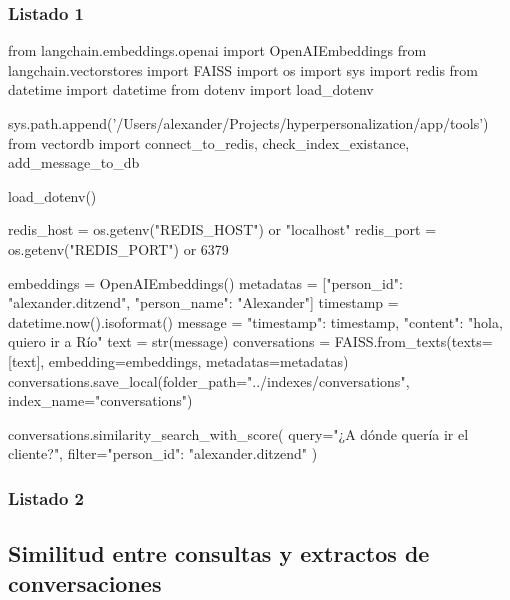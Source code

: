\subsubsection{Listado 1}
\label{anexo:code-4-1-2-1}

\begin{APACode}
from langchain.embeddings.openai import OpenAIEmbeddings
from langchain.vectorstores import FAISS
import os
import sys
import redis
from datetime import datetime
from dotenv import load_dotenv

sys.path.append('/Users/alexander/Projects/hyperpersonalization/app/tools')
from vectordb import connect_to_redis, check_index_existance, add_message_to_db

load_dotenv()

redis_host = os.getenv("REDIS_HOST") or "localhost"
redis_port = os.getenv("REDIS_PORT") or 6379

embeddings = OpenAIEmbeddings()
metadatas = [{"person_id": "alexander.ditzend", "person_name": "Alexander"}]
timestamp = datetime.now().isoformat()
message = {"timestamp": timestamp, "content": "hola, quiero ir a Río"}
text = str(message)
conversations = FAISS.from_texts(texts=[text], embedding=embeddings, 
                                metadatas=metadatas)
conversations.save_local(folder_path="../indexes/conversations", 
                        index_name="conversations")

conversations.similarity_search_with_score(
    query="¿A dónde quería ir el cliente?", 
    filter={"person_id": "alexander.ditzend"}
)
\end{APACode}

\subsubsection{Listado 2}
\label{anexo:code-4-1-2-2}

\begin{APACode}
[(Document(page_content="{'timestamp': '2023-07-12T12:00:22.538965', 
                        'content': 'hola, quiero ir a Río'}", 
          metadata={'person_id': 'alexander.ditzend', 
                   'person_name': 'Alexander'}), 
  0.50811493)]
\end{APACode}

\subsection{Similitud entre consultas y extractos de conversaciones}


